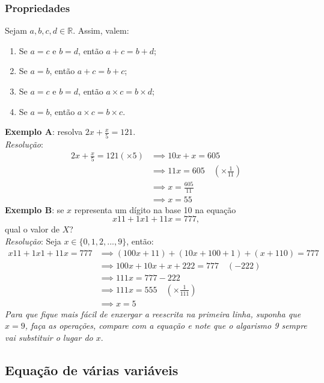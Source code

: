 \documentclass[13pt,letterpaper]{article}
\begin{document}
\subsubsection{Propriedades}
Sejam $a, b, c, d \in \mathbb{R}$. Assim, valem:
\begin{enumerate}
    \item Se $a = c$ e $b = d$, então $a + c = b + d$;
    \item Se $a = b$, então $a + c = b + c$;
    \item Se $a = c$ e $b = d$, então $a \times c = b \times d$;
    \item Se $a = b$, então $a \times c = b \times c$.
\end{enumerate}
\textbf{Exemplo A}: resolva $2x + \frac{x}{5} = 121$. \\
\emph{Resolução}:
\begin{align*}
    2x + \frac{x}{5} = 121 (\times 5) &\implies 
    10x + x = 605 \\ &\implies
    11x = 605 \quad (\times \frac{1}{11}) \\ &\implies 
    x = \frac{605}{11} \\ &\implies 
    x = 55
\end{align*}
\textbf{Exemplo B}: se $x$ representa um dígito na base 10 na equação
\begin{displaymath}
    x11 + 1x1 + 11x = 777,
\end{displaymath}
qual o valor de $X$? \\
\emph{Resolução}: Seja $x \in \{0, 1, 2, ..., 9 \}$, então:
\begin{align*}
    x11 + 1x1 + 11x = 777 &\implies 
    (100x + 11) + (10x + 100 + 1) + (x + 110) = 777 \\ &\implies
    100x + 10x + x + 222 = 777 \quad (-222) \\ &\implies
    111x = 777 - 222 \\ &\implies
    111x = 555 \quad (\times \frac{1}{111}) \\ &\implies
    x = 5
\end{align*}
\emph{Para que fique mais fácil de enxergar a reescrita na primeira linha, suponha que $x = 9$, faça as operações, compare com a equação e note que o algarismo 9 sempre vai substituir o lugar do $x$}.

\subsection{Equação de várias variáveis}
\end{document}
